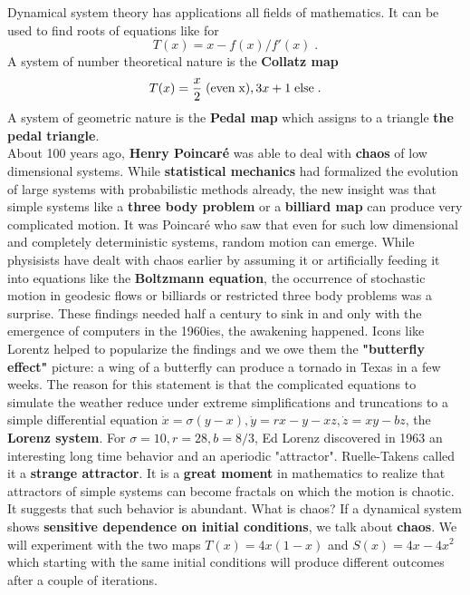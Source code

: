 \documentclass[12pt]{amsart}
\begin{document}
Dynamical system theory has applications  all fields of mathematics. It can be used to find roots of equations
like for 
$$T(x) = x - f(x)/f'(x)  \; . $$
A system of number theoretical nature is the {\bf Collatz map} 
$$   T(x) = \frac{x}{2} \; {\rm (even \; x)}, 3x+1 \; {\rm else}  \; . $$
A system of geometric nature is the {\bf Pedal map} which assigns to a triangle
{\bf the pedal triangle}.  \\
About 100 years ago, {\bf Henry Poincar\'e} was able to 
deal with {\bf chaos} of low dimensional systems. While {\bf statistical mechanics} 
had formalized the evolution of large systems with probabilistic methods already, the new
insight was that simple systems like a {\bf three body problem} or a {\bf billiard map} can produce very 
complicated motion. It was Poincar\'e who saw that even for such low dimensional and completely 
deterministic systems, random motion can emerge. While physisists have dealt with chaos 
earlier by assuming it or artificially feeding it into equations like the {\bf Boltzmann equation},
the occurrence of stochastic motion in geodesic flows or billiards or restricted three body problems 
was a surprise. These findings needed half a century to sink in and only with the emergence of computers 
in the 1960ies, the awakening happened. Icons like Lorentz helped to popularize the findings 
and we owe them the {\bf "butterfly effect"} picture: a wing of a butterfly can produce a tornado in Texas in a
few weeks. The reason for this statement is that the complicated equations to simulate the weather reduce
under extreme simplifications and truncations to a simple differential equation $\dot{x} =\sigma (y-x),
\dot{y}=rx - y -xz, \dot{z} = xy - bz$, the {\bf Lorenz system}. For $\sigma=10,r=28,b=8/3$, Ed Lorenz discovered 
in 1963 an interesting long time behavior and an aperiodic "attractor". Ruelle-Takens called it a 
{\bf strange attractor}. It is a {\bf great moment} in mathematics to realize that attractors of simple 
systems can become fractals on which the motion is chaotic. It suggests that such behavior
is abundant. What is chaos? If a dynamical system shows {\bf sensitive dependence 
on initial conditions}, we talk about {\bf chaos}. We will experiment with the 
two maps $T(x) = 4x (1-x)$ and $S(x) = 4x - 4x^2$ which starting with the same initial conditions will 
produce different outcomes after a couple of iterations. 
\end{document}
